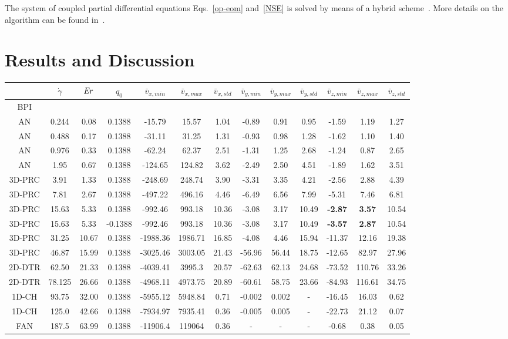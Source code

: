 \documentclass[aps,pre,reprint,superscriptaddress, twocolumn]{revtex4}
\begin{document}
The system of coupled partial differential equations Eqs.~\ref{op-eom}
and~\ref{NSE} is solved by means of a
hybrid scheme~\cite{Marenduzzo:2007}. 
More details on the algorithm can
be found in~\cite{Denniston:2001, Denniston:2004}.


\section{Results and Discussion}

\begin{table}[htpb]
\begin{tabular}{|c||c|| c || c || c |c |c||c| c| c||c| c| c|}
\hline
& $\dot{\gamma}$ & ${\it Er}$ & $q_0$ & $\bar{v}_{x,min}$ & $\bar{v}_{x,max}$ & $\bar{v}_{x,std}$ & $\bar{v}_{y,min}$ & $\bar{v}_{y,max}$ & $\bar{v}_{y,std}$ & $\bar{v}_{z,min}$ & $\bar{v}_{z,max}$ & $\bar{v}_{z,std}$ \\
\hline
BPI \\
\hline
AN & 0.244 & 0.08& 0.1388 &-15.79 &15.57 &1.04 &-0.89 &0.91 &0.95 &-1.59 &1.19 &1.27 \\
AN & 0.488 & 0.17 & 0.1388 &-31.11 &31.25 &1.31 &-0.93 &0.98 &1.28 &-1.62 &1.10 &1.40 \\
AN & 0.976 & 0.33 & 0.1388 &-62.24 &62.37 &2.51 &-1.31 &1.25 &2.68 &-1.24 &0.87 &2.65 \\
AN & 1.95 & 0.67 & 0.1388 &-124.65 &124.82 &3.62&  -2.49 &2.50 &4.51 &-1.89 & 1.62 &3.51 \\
\hline
3D-PRC & 3.91 & 1.33 & 0.1388 &-248.69 &248.74 &3.90&  -3.31 &3.35 &4.21 &-2.56 & 2.88 &4.39 \\
3D-PRC & 7.81 & 2.67 & 0.1388 &-497.22 &496.16 &4.46 &-6.49 &6.56 &7.99 &-5.31 & 7.46 &6.81 \\ 
3D-PRC & 15.63 & 5.33 & 0.1388 &-992.46 &993.18 &10.36 &-3.08 &3.17 &10.49 &\bf{-2.87} & \bf{3.57} &10.54 \\
3D-PRC & 15.63 & 5.33 & -0.1388 &-992.46 &993.18 &10.36 &-3.08 &3.17 &10.49 &\bf{-3.57} & \bf{2.87} &10.54 \\
3D-PRC & 31.25 &10.67 & 0.1388 & -1988.36 &1986.71 &16.85 &-4.08 &4.46 &15.94 &-11.37 & 12.16 &19.38\\
3D-PRC & 46.87 & 15.99 & 0.1388 & -3025.46 & 3003.05 &21.43 & -56.96 & 56.44  & 18.75 & -12.65 & 82.97  & 27.96\\
\hline
2D-DTR & 62.50 & 21.33& 0.1388 & -4039.41 &3995.3  & 20.57 & -62.63 & 62.13 & 24.68 &-73.52 & 110.76 & 33.26 \\
2D-DTR &78.125 &26.66 & 0.1388 & -4968.11 &4973.75 &20.89 &-60.61 &58.75 &23.66 &-84.93 &116.61 &34.75 \\
\hline
1D-CH & 93.75 &32.00 & 0.1388 & -5955.12 &5948.84 & 0.71 & -0.002 & 0.002 & -  & -16.45 & 16.03 &0.62 \\
1D-CH & 125.0 & 42.66& 0.1388 & -7934.97 & 7935.41 & 0.36 & -0.005 & 0.005 & - &-22.73 & 21.12 & 0.07\\
\hline
FAN & 187.5 & 63.99& 0.1388 &-11906.4  &119064 &0.36 &- &- &- &-0.68 & 0.38 & 0.05\\
\hline


\end{tabular}
\end{table}
\end{document}
